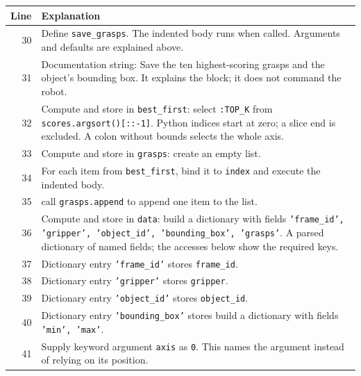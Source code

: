 \documentclass[11pt,a4paper]{book}
\begin{document}
\begin{longtable}{r p{}}

\textbf{Line} & \textbf{Explanation} \\ \hline \endhead

30 & Define \texttt{save\_grasps}. The indented body runs when called. Arguments and defaults are explained above. \\

31 & Documentation string: Save the ten highest-scoring grasps and the object's bounding box. It explains the block; it does not command the robot. \\

32 & Compute and store in \texttt{best\_first}: select \texttt{:TOP\_K} from \texttt{scores.argsort()[::-1]}. Python indices start at zero; a slice end is excluded. A colon without bounds selects the whole axis.  \\

33 & Compute and store in \texttt{grasps}: create an empty list.  \\

34 & For each item from \texttt{best\_first}, bind it to \texttt{index} and execute the indented body. \\

35 & call \texttt{grasps.append} to append one item to the list. \\

36 & Compute and store in \texttt{data}: build a dictionary with fields \texttt{'frame\_id', 'gripper', 'object\_id', 'bounding\_box', 'grasps'}. A parsed dictionary of named fields; the accesses below show the required keys. \\

37 & Dictionary entry \texttt{'frame\_id'} stores \texttt{frame\_id}. \\

38 & Dictionary entry \texttt{'gripper'} stores \texttt{gripper}. \\

39 & Dictionary entry \texttt{'object\_id'} stores \texttt{object\_id}. \\

40 & Dictionary entry \texttt{'bounding\_box'} stores build a dictionary with fields \texttt{'min', 'max'}. \\

41 & Supply keyword argument \texttt{axis} as \texttt{0}. This names the argument instead of relying on its position. \\


\end{longtable}
\end{document}
